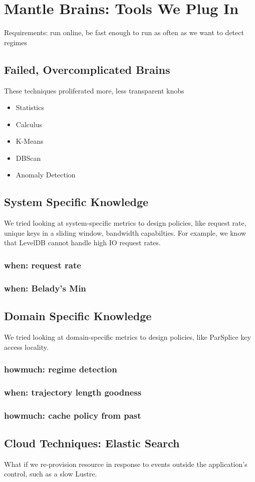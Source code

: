 \section{Mantle Brains: Tools We Plug In}

Requirements: run online, be fast enough to run as often as we want to detect
regimes

\subsection{Failed, Overcomplicated Brains}
These techniques proliferated more, less transparent knobs
\begin{itemize}
  \item Statistics
  \item Calculus
  \item K-Means
  \item DBScan
  \item Anomaly Detection
\end{itemize}

\subsection{System Specific Knowledge}

We tried looking at system-specific metrics to design policies, like request
rate, unique keys in a sliding window, bandwidth capabilties. For example, we
know that LevelDB cannot handle high IO request rates.

\subsubsection{when: request rate}

\subsubsection{when: Belady's Min}

\subsection{Domain Specific Knowledge}

We tried looking at domain-specific metrics to design policies, like ParSplice
key access locality.

\subsubsection{howmuch: regime detection}
\subsubsection{when: trajectory length goodness}
\subsubsection{howmuch: cache policy from past}

\subsection{Cloud Techniques: Elastic Search}

What if we re-provision resource in response to events outside the
application's control, such as a slow Lustre.

